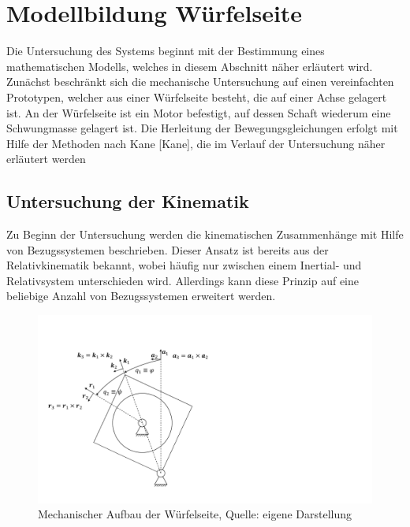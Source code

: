 \section{Modellbildung Würfelseite}
Die Untersuchung des Systems beginnt mit der Bestimmung eines mathematischen Modells, welches in diesem Abschnitt näher erläutert wird.  Zunächst beschränkt sich die mechanische Untersuchung auf einen vereinfachten Prototypen, welcher aus einer Würfelseite besteht, die auf einer Achse gelagert ist. An der Würfelseite ist ein Motor befestigt, auf dessen Schaft wiederum eine Schwungmasse gelagert ist. Die Herleitung der Bewegungsgleichungen erfolgt mit Hilfe der Methoden nach Kane [Kane], die im Verlauf der Untersuchung näher erläutert werden

\subsection{Untersuchung der Kinematik}
Zu Beginn der Untersuchung werden die kinematischen Zusammenhänge mit Hilfe von Bezugssystemen beschrieben. Dieser Ansatz ist bereits aus der Relativkinematik bekannt, wobei häufig nur zwischen einem Inertial- und Relativsystem unterschieden wird. Allerdings kann diese Prinzip auf eine beliebige Anzahl von Bezugssystemen erweitert werden.

\begin{figure}[!h]
\centering
\includegraphics[width=0.6\linewidth, trim={1cm 1.5cm 18cm 3.5cm}, clip]{2_ModellWuerfelseite/img/ModellWuerfelseite}
\caption{Mechanischer Aufbau der Würfelseite, Quelle: eigene Darstellung}
\label{abb_wuerfelseite}
\end{figure}

